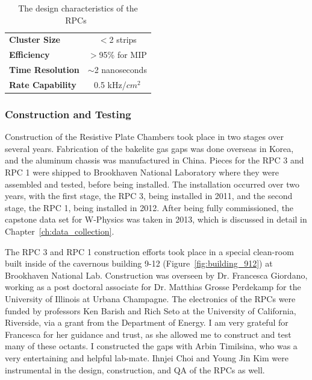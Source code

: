 \begin{table}[ht]
  \centering
  \begin{tabular}{lc}
    \toprule 
    \textbf{Cluster Size} & $<$2 strips \\
    \textbf{Efficiency} & $>$95\% for MIP \\
    \textbf{Time Resolution} & $\sim$2 nanoseconds \\
    \textbf{Rate Capability} & 0.5 kHz/$cm^2$ \\
    \bottomrule
  \end{tabular}
  \caption{
    The design characteristics of the RPCs~\cite{Fukao2011}
  }
  \label{tab:rpc_design_characteristics}
\end{table}

\subsubsection{Construction and Testing}

Construction of the Resistive Plate Chambers took place in two stages over
several years. Fabrication of the bakelite gas gaps was done overseas in Korea,
and the aluminum chassis was manufactured in China. Pieces for the RPC 3 and RPC
1 were shipped to Brookhaven National Laboratory where they were assembled and
tested, before being installed. The installation occurred over two years, with
the first stage, the RPC 3, being installed in 2011, and the second stage, the
RPC 1, being installed in 2012. After being fully commissioned, the capstone
data set for W-Physics was taken in 2013, which is discussed in detail in
Chapter~\ref{ch:data_collection}.

The RPC 3 and RPC 1 construction efforts took place in a special clean-room
built inside of the cavernous building 9-12 (Figure~\ref{fig:building_912}) at
Brookhaven National Lab. Construction was overseen by Dr. Francesca Giordano,
working as a post doctoral associate for Dr. Matthias Grosse Perdekamp for the
University of Illinois at Urbana Champagne. The electronics of the RPCs were
funded by professors Ken Barish and Rich Seto at the University of California,
Riverside, via a grant from the Department of Energy.  I am very grateful for
Francesca for her guidance and trust, as she allowed me to construct and test
many of these octants. I constructed the gaps with Arbin Timilsina, who was a
very entertaining and helpful lab-mate. Ihnjei Choi and Young Jin Kim were
instrumental in the design, construction, and QA of the RPCs as well. 

